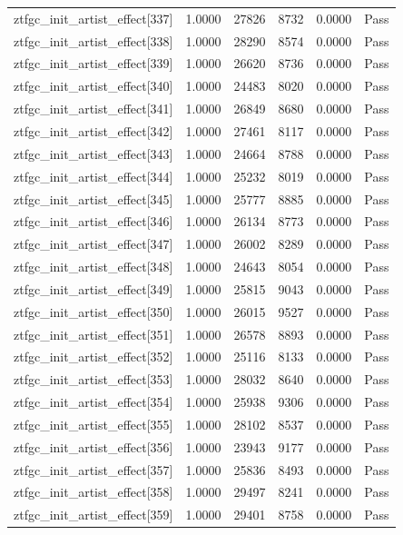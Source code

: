 \begin{table}[htbp]
\begin{tabular}{llrrll}
ztfgc\_init\_artist\_effect[337] & 1.0000 & 27826 & 8732 & 0.0000 & Pass \\
ztfgc\_init\_artist\_effect[338] & 1.0000 & 28290 & 8574 & 0.0000 & Pass \\
ztfgc\_init\_artist\_effect[339] & 1.0000 & 26620 & 8736 & 0.0000 & Pass \\
ztfgc\_init\_artist\_effect[340] & 1.0000 & 24483 & 8020 & 0.0000 & Pass \\
ztfgc\_init\_artist\_effect[341] & 1.0000 & 26849 & 8680 & 0.0000 & Pass \\
ztfgc\_init\_artist\_effect[342] & 1.0000 & 27461 & 8117 & 0.0000 & Pass \\
ztfgc\_init\_artist\_effect[343] & 1.0000 & 24664 & 8788 & 0.0000 & Pass \\
ztfgc\_init\_artist\_effect[344] & 1.0000 & 25232 & 8019 & 0.0000 & Pass \\
ztfgc\_init\_artist\_effect[345] & 1.0000 & 25777 & 8885 & 0.0000 & Pass \\
ztfgc\_init\_artist\_effect[346] & 1.0000 & 26134 & 8773 & 0.0000 & Pass \\
ztfgc\_init\_artist\_effect[347] & 1.0000 & 26002 & 8289 & 0.0000 & Pass \\
ztfgc\_init\_artist\_effect[348] & 1.0000 & 24643 & 8054 & 0.0000 & Pass \\
ztfgc\_init\_artist\_effect[349] & 1.0000 & 25815 & 9043 & 0.0000 & Pass \\
ztfgc\_init\_artist\_effect[350] & 1.0000 & 26015 & 9527 & 0.0000 & Pass \\
ztfgc\_init\_artist\_effect[351] & 1.0000 & 26578 & 8893 & 0.0000 & Pass \\
ztfgc\_init\_artist\_effect[352] & 1.0000 & 25116 & 8133 & 0.0000 & Pass \\
ztfgc\_init\_artist\_effect[353] & 1.0000 & 28032 & 8640 & 0.0000 & Pass \\
ztfgc\_init\_artist\_effect[354] & 1.0000 & 25938 & 9306 & 0.0000 & Pass \\
ztfgc\_init\_artist\_effect[355] & 1.0000 & 28102 & 8537 & 0.0000 & Pass \\
ztfgc\_init\_artist\_effect[356] & 1.0000 & 23943 & 9177 & 0.0000 & Pass \\
ztfgc\_init\_artist\_effect[357] & 1.0000 & 25836 & 8493 & 0.0000 & Pass \\
ztfgc\_init\_artist\_effect[358] & 1.0000 & 29497 & 8241 & 0.0000 & Pass \\
ztfgc\_init\_artist\_effect[359] & 1.0000 & 29401 & 8758 & 0.0000 & Pass \\

\end{tabular}
\end{table}

